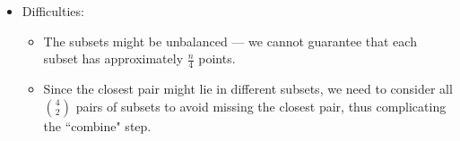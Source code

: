 \documentclass[mathserif]{beamer}
\begin{document}
{\begin{itemize}
\begin{figure}[H]
\begin{tikzpicture}[scale=0.9, auto,swap]
    \end{tikzpicture}	
\end{figure}


\item Difficulties: 
	\begin{itemize}
		\item 
The subsets might be unbalanced  --- we cannot guarantee that each subset has approximately $\frac{n}{4}$ points. 
		\item Since the closest pair might lie in different subsets, we need to consider all ${4}\choose{2}$ pairs of subsets to avoid missing the closest pair, thus complicating  the ``combine" step. 
	\end{itemize}

\end{itemize}

}

\end{document}
